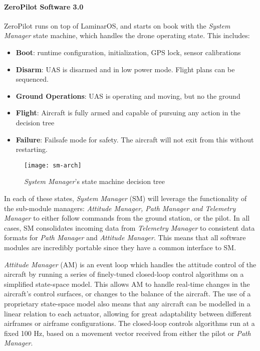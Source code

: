 \paragraph{ZeroPilot Software 3.0}

ZeroPilot runs on top of LaminarOS, and starts on book with the \textit{System 
Manager} state machine, which handles the drone operating state. This includes:
\begin{itemize}
    \item \textbf{Boot}: runtime configuration, initialization, GPS lock, sensor 
    calibrations
    \item \textbf{Disarm}: UAS is disarmed and in low power mode. Flight plans can be
    sequenced.
    \item \textbf{Ground Operations}: UAS is operating and moving, but no the ground
    \item \textbf{Flight}: Aircraft is fully armed and capable of pursuing any action
    in the decision tree
    \item \textbf{Failure}: Failsafe mode for safety. The aircraft will not exit from
    this without restarting.
\end{itemize}


\begin{figure}[H]
        \centering
        \texttt{[image: sm-arch]}
        \caption{\textit{System Manager}'s state machine decision tree}
\end{figure}

In each of these states, \textit{System Manager} (SM) will leverage the functionality 
of the sub-module managers: \textit{Attitude Manager, Path Manager and Telemetry 
Manager} to either follow commands from the ground station, or the pilot. In all 
cases, SM consolidates incoming data from \textit{Telemetry Manager} to consistent 
data formats for \textit{Path Manager} and \textit{Attitude Manager}. This means that 
all software modules are incredibly portable since they have a common interface to SM.

\textit{Attitude Manager} (AM) is an event loop which handles the attitude control of
the aircraft by running a series of finely-tuned closed-loop control algorithms on a
simplified state-space model. This allows AM to handle real-time changes in the
aircraft's control surfaces, or changes to the balance of the aircraft. The use of
a proprietary state-space model also means that any aircraft can be modelled in a
linear relation to each actuator, allowing for great adaptability between different
airframes or airframe configurations. The closed-loop controls algorithms run at a
fixed 100 Hz, based on a movement vector received from either the pilot or
\textit{Path Manager}.

